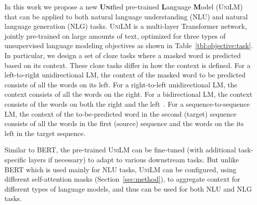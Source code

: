 \documentclass{article}
\newcommand\ours{\textsc{UniLM}}
\begin{document}
In this work we propose a new \textsc{\textbf{Uni}}fied pre-trained \textbf{L}anguage \textbf{M}odel (\ours) that can be applied to both natural language understanding (NLU) and natural language generation (NLG) tasks. 
\ours{} is a multi-layer Transformer network, jointly pre-trained on large amounts of text, optimized for three types of unsupervised language modeling objectives as shown in Table~\ref{tbl:objective:task}. %
In particular, we design a set of cloze tasks \cite{taylor1953cloze} 
where a masked word is predicted based on its context. These cloze tasks differ in how the context is defined. 
For a left-to-right unidirectional LM, the context of the masked word to be predicted consists of all the words on its left.     
For a right-to-left unidirectional LM, the context consists of all the words on the right.
For a bidirectional LM, the context consists of the words on both the right and the left~\cite{bert}. 
For a sequence-to-sequence LM, the context of the to-be-predicted word in the second (target) sequence consists of all the words in the first (source) sequence and the words on the its left in the target sequence. 

Similar to BERT, the pre-trained \ours{} can be fine-tuned (with additional task-specific layers if necessary) to adapt to various downstream tasks. But unlike BERT which is used mainly for NLU tasks, \ours{} can be configured, using different self-attention masks (Section~\ref{sec:method}), to aggregate context for different types of language models, and thus can be used for both NLU and NLG tasks. 

\end{document}
